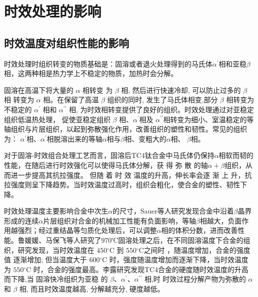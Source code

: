 \section{时效处理的影响}
\subsection{时效温度对组织性能的影响}

时效处理时组织转变的物质基础是：固溶或者退火处理得到的马氏体$ \alpha^{\prime} $相和亚稳$ \beta $相，这两种相是热力学上不稳定的物质，加热时会分解。

固溶在高温下将大量的 $\alpha$ 相转变 为 $\beta$ 相, 然后进行快速冷却, 可以防止过多的 $\beta$ 相 转变为 $\alpha$ 相。在保留了高温 $\beta$ 组织的同时, 发生了马氏体相变,部分 $\beta$ 相转变为不稳定的 $\alpha^{\prime}$ 相和 $\alpha^{\prime \prime}$ 相, 为时效相转变提供了良好的组织\cite{ xinsheweiGuanyutaihejinrechulihexichuxiangdetaolun2006,zouhaibeiTC4taihejinrechuliqianghuagongyijixiangbianhangweiyanjiu2019a}。时效处理通过对亚稳定组织低温热处理， 促使亚稳定组织 $\beta$ 相、$ \alpha  ^{\prime}$相及 $ \alpha  ^{\prime\prime}$相转变为细小、室温稳定的等轴组织与片层组织，以起到弥散强化作用，改善组织的塑性和韧性。常见的组织为\cite{zhanghaoyinGurongShixiaoduiTC4taihejinzuzhihelixuexingnengdeyingxiang2014}： $ \alpha  ^{\prime}$相、$ \alpha  ^{\prime}$相脱溶出来的等轴$ \alpha$相与$ \beta $相、变粗大的$ \alpha $相、 $ \beta $相。

对于固溶-时效组合处理工艺而言，固溶后TC4钛合金中马氏体仍保持$ \alpha $相软而韧的性能，在随后进行时效强化可以使得马氏体分解，获 得 弥 散 的轴$ \alpha+\beta $组织，从而进一步提高其抗拉强度。 但随 着 时 效 温度的升高，伸长率会逐 渐 上 升，抗拉强度则呈下降趋势。当时效温度过高时，组织会粗化，使合金的塑性、韧性下降\cite{guxiaohuiCuihuoShixiaowenduduiTC4taihejinzuzhihelixuexingnengdeyingxiang2011}。

时效处理温度主要影响\ti 合金中次生$ \alpha $的尺寸，Sauer\cite{sauerThermomechanicalProcessingHigh2001}等人研究发现\ti 合金中沿着$ \beta $晶界形成的连续$ \alpha  $片层组织对合金的机械加工性能有负面影响，等轴$ \beta $相越大，负面作用越强烈；经过重结晶等匀质化处理后，可以调整$ \alpha $相的体积分数，进而改善性能。鲁媛媛、马保飞\cite{luyuanyuanShixiaochuliduiTC4taihejinweiguanzuzhihelixuexingnengdeyingxiang2019}等人研究了970℃固溶处理之后，在不同固溶温度下合金的组织，研究发现，当时效温度在 $450{ }^{\circ} \mathrm{C}$ 到 $550{ }^{\circ} \mathrm{C}$之间时 ，随温度增加，合金的强度值 逐渐增加; 但当温度大于 $600{ }^{\circ} \mathrm{C}$ 时，强度随温度增加而逐渐下降，当时效温度为 $550{ }^{\circ} \mathrm{C}$ 时，合金的强度最高。李露\cite{lilouGurongshixiaoduiTC4hejinzuzhiyujixiexingnengdeyingxiang2014}研究发现TC4合金的硬度随时效温度的升高而下降,当 固溶快冷组织为亚稳 的 $\beta 、 \alpha^{\prime} 、 \alpha^{\prime\prime}$ 相,时 时效过程分解产物为弥散的 $\alpha$ 和 $\beta$ 相, 而且时效温度越高, 分解越充分, 硬度越低。

